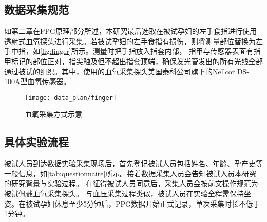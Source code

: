 \subsection{数据采集规范}
如第二章在PPG原理部分所述，本研究最后选取在被试孕妇的左手食指进行使用透射式血氧探头进行采集。若被试孕妇的左手食指有损伤，则将测量部位替换为左手中指，如\autoref{fig:finger}所示。测量时把手指放入指套内部，
指甲与传感器表面有指甲标记的部位正对，指尖触及但不超出指套顶端，确保发光管发出的所有光线全部通过被试的组织。其中，使用的血氧采集探头美国泰科公司旗下的Nellcor DS-100A型血氧传感器。 
\begin{figure}[htbp]
      \centering
      \texttt{[image: data\_plan/finger]}
      \caption{\label{fig:finger}血氧采集方式示意}
\end{figure}
\subsection{具体实验流程}
被试人员到达数据实验采集现场后，首先登记被试人员包括姓名、年龄、孕产史等一般信息，如\autoref{tab:questionnaire}所示。接着数据采集人员会告知被试人员本研究的研究背景与实验过程。
在征得被试人员同意后，采集人员会按前文操作规范为被试佩戴血氧采集探头\cite{Chen2021}。
与血压采集过程类似\cite{FIGO}，被试人员在实验全程需保持坐姿。在被试孕妇休息至少5分钟后，PPG数据开始正式记录，单次采集时长不低于1分钟。
